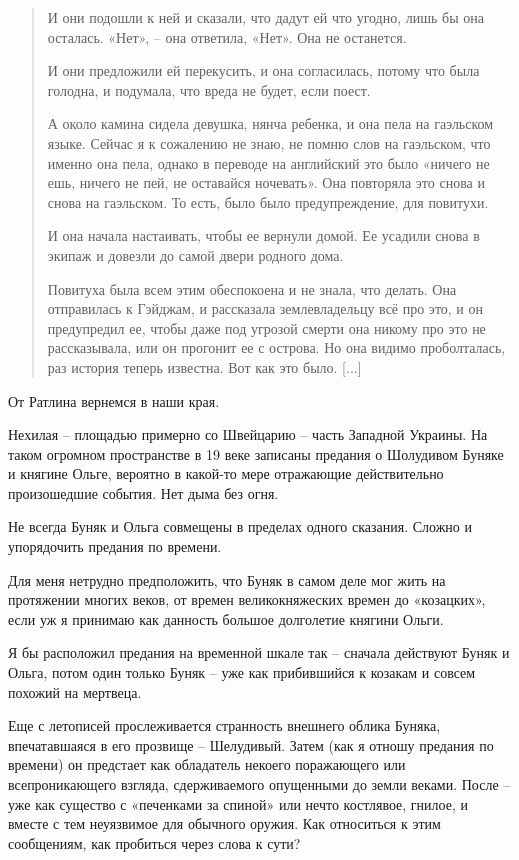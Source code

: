\begin{quotation}
И они подошли к ней и сказали, что дадут ей что угодно, лишь бы она осталась. «Нет», – она ответила, «Нет». Она не останется.

И они предложили ей перекусить, и она согласилась, потому что была голодна, и подумала, что вреда не будет, если поест.

А около камина сидела девушка, нянча ребенка, и она пела на гаэльском языке. Сейчас я к сожалению не знаю, не помню слов на гаэльском, что именно она пела, однако в переводе на английский это было «ничего не ешь, ничего не пей, не оставайся ночевать». Она повторяла это снова и снова на гаэльском. То есть, было было предупреждение, для повитухи.

И она начала настаивать, чтобы ее вернули домой. Ее усадили снова в экипаж и довезли до самой двери родного дома. 

Повитуха была всем этим обеспокоена и не знала, что делать. Она отправилась к Гэйджам, и рассказала землевладельцу всё про это, и он предупредил ее, чтобы даже под угрозой смерти она никому про это не рассказывала, или он прогонит ее с острова. Но она видимо проболталась, раз история теперь известна. Вот как это было. [...]
\end{quotation}

От Ратлина вернемся в наши края.

Нехилая – площадью примерно со Швейцарию – часть Западной Украины. На таком огромном пространстве в 19 веке записаны предания о Шолудивом Буняке и княгине Ольге, вероятно в какой-то мере отражающие действительно произошедшие события. Нет дыма без огня.
 

Не всегда Буняк и Ольга совмещены в пределах одного сказания. Сложно и упорядочить предания по времени.

Для меня нетрудно предположить, что Буняк в самом деле мог жить на протяжении многих веков, от времен великокняжеских времен до «козацких», если уж я принимаю как данность большое долголетие княгини Ольги.

Я бы расположил предания на временной шкале так – сначала действуют Буняк и Ольга, потом один только Буняк – уже как прибившийся к козакам и совсем похожий на мертвеца.

Еще с летописей прослеживается странность внешнего облика Буняка, впечатавшаяся в его прозвище – Шелудивый. Затем (как я отношу предания по времени) он предстает как обладатель некоего поражающего или всепроникающего взгляда, сдерживаемого опущенными до земли веками. После – уже как существо с «печенками за спиной» или нечто костлявое, гнилое, и вместе с тем неуязвимое для обычного оружия. Как относиться к этим сообщениям, как пробиться через слова к сути?


